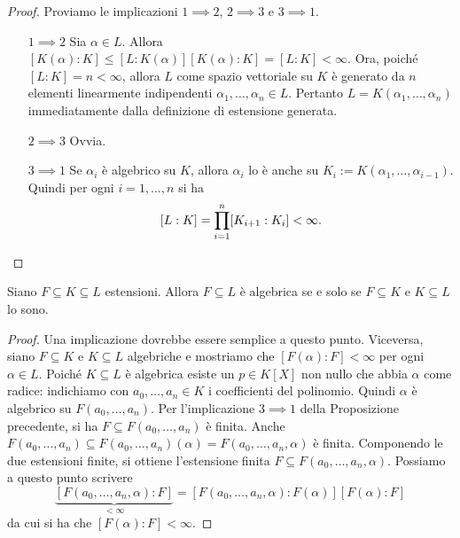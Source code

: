 \begin{proof}
Proviamo le implicazioni $1 \implies 2$, $2 \implies 3$ e $3 \implies 1$. 
\begin{itemize}[leftmargin=*]
\item[$1 \implies 2$] Sia $\alpha \in L$. Allora $[K(\alpha):K] \le [L:K(\alpha)] [K(\alpha):K] = [L:K] < \infty$. Ora, poiché $[L:K] = n < \infty$, allora $L$ come spazio vettoriale su $K$ è generato da $n$ elementi linearmente indipendenti $\alpha_1, \dots{}, \alpha_n \in L$. Pertanto $L=K(\alpha_1,\dots,\alpha_n)$ immediatamente dalla definizione di estensione generata.
\item[$2\implies3$] Ovvia.
\item[$3\implies1$] Se $\alpha_i$ è algebrico su $K$, allora $\alpha_i$ lo è anche su $K_i:=K(\alpha_1,\dots,\alpha_{i-1})$. Quindi per ogni $i=1,\dots,n$ si ha
\[[L:K]=\prod_{i=1}^n[K_{i+1}:K_i]<\infty .\qedhere\]
\end{itemize}
\end{proof}


\begin{prop}
Siano $F\subseteq K\subseteq L$ estensioni. Allora $F\subseteq L$ è algebrica se e solo se $F \subseteq K$ e $K \subseteq L$ lo sono.
\end{prop}

\begin{proof}
Una implicazione dovrebbe essere semplice a questo punto. Viceversa, siano $F \subseteq K$ e $K \subseteq L$ algebriche e mostriamo che $[F(\alpha):F] < \infty$ per ogni $\alpha \in L$. Poiché $K \subseteq L$ è algebrica esiste un $p \in K[X]$ non nullo che abbia $\alpha$ come radice: indichiamo con $a_0, \dots{}, a_n \in K$ i coefficienti del polinomio. Quindi $\alpha$ è algebrico su $F\left(a_0, \dots{}, a_n\right)$. Per l'implicazione $3 \implies 1$ della Proposizione precedente, si ha $F \subseteq F\left(a_0, \dots{}, a_n\right)$ è finita. Anche $F\left(a_0, \dots{}, a_n\right) \subseteq F\left(a_0, \dots{}, a_n\right)(\alpha) = F\left(a_0, \dots{}, a_n, \alpha\right)$ è finita. Componendo le due estensioni finite, si ottiene l'estensione finita $F \subseteq F\left(a_0, \dots{}, a_n, \alpha\right)$. Possiamo a questo punto scrivere
\[\underbrace{[F\left(a_0, \dots{}, a_n, \alpha\right) : F]}_{< \infty} = [F\left(a_0, \dots{}, a_n, \alpha\right) : F(\alpha)] [F(\alpha) : F]\]
da cui si ha che $[F(\alpha):F] < \infty$.
\end{proof}


